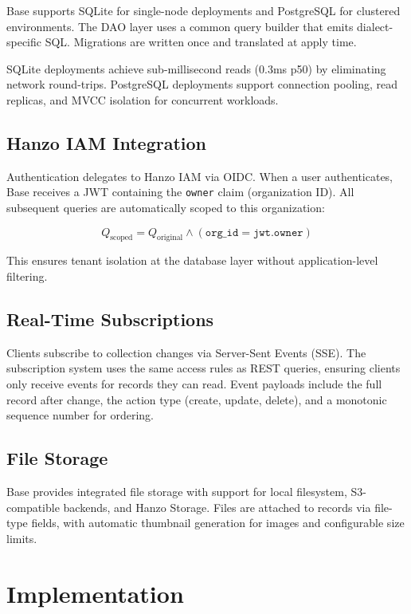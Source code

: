 \documentclass[11pt,twocolumn]{article}
\begin{document}
Base supports SQLite for single-node deployments and PostgreSQL for clustered environments. The DAO layer uses a common query builder that emits dialect-specific SQL. Migrations are written once and translated at apply time.

SQLite deployments achieve sub-millisecond reads (0.3ms p50) by eliminating network round-trips. PostgreSQL deployments support connection pooling, read replicas, and MVCC isolation for concurrent workloads.

\subsection{Hanzo IAM Integration}

Authentication delegates to Hanzo IAM via OIDC. When a user authenticates, Base receives a JWT containing the \texttt{owner} claim (organization ID). All subsequent queries are automatically scoped to this organization:

\begin{equation}
    Q_{\text{scoped}} = Q_{\text{original}} \wedge (\texttt{org\_id} = \texttt{jwt.owner})
\end{equation}

This ensures tenant isolation at the database layer without application-level filtering.

\subsection{Real-Time Subscriptions}

Clients subscribe to collection changes via Server-Sent Events (SSE). The subscription system uses the same access rules as REST queries, ensuring clients only receive events for records they can read. Event payloads include the full record after change, the action type (create, update, delete), and a monotonic sequence number for ordering.

\subsection{File Storage}

Base provides integrated file storage with support for local filesystem, S3-compatible backends, and Hanzo Storage. Files are attached to records via file-type fields, with automatic thumbnail generation for images and configurable size limits.

\section{Implementation}
\end{document}
